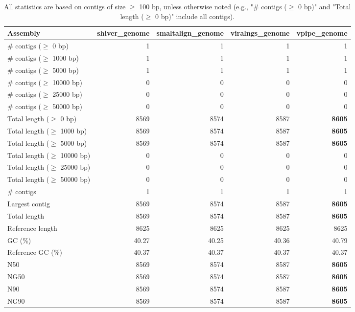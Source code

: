 \documentclass[12pt,a4paper]{article}
\begin{document}
\begin{table}[ht]
\begin{center}
\caption{All statistics are based on contigs of size $\geq$ 100 bp, unless otherwise noted (e.g., "\# contigs ($\geq$ 0 bp)" and "Total length ($\geq$ 0 bp)" include all contigs).}
\begin{tabular}{|l*{4}{|r}|}
\hline
Assembly & shiver\_genome & smaltalign\_genome & viralngs\_genome & vpipe\_genome \\ \hline
\# contigs ($\geq$ 0 bp) & 1 & 1 & 1 & 1 \\ \hline
\# contigs ($\geq$ 1000 bp) & 1 & 1 & 1 & 1 \\ \hline
\# contigs ($\geq$ 5000 bp) & 1 & 1 & 1 & 1 \\ \hline
\# contigs ($\geq$ 10000 bp) & 0 & 0 & 0 & 0 \\ \hline
\# contigs ($\geq$ 25000 bp) & 0 & 0 & 0 & 0 \\ \hline
\# contigs ($\geq$ 50000 bp) & 0 & 0 & 0 & 0 \\ \hline
Total length ($\geq$ 0 bp) & 8569 & 8574 & 8587 & {\bf 8605} \\ \hline
Total length ($\geq$ 1000 bp) & 8569 & 8574 & 8587 & {\bf 8605} \\ \hline
Total length ($\geq$ 5000 bp) & 8569 & 8574 & 8587 & {\bf 8605} \\ \hline
Total length ($\geq$ 10000 bp) & 0 & 0 & 0 & 0 \\ \hline
Total length ($\geq$ 25000 bp) & 0 & 0 & 0 & 0 \\ \hline
Total length ($\geq$ 50000 bp) & 0 & 0 & 0 & 0 \\ \hline
\# contigs & 1 & 1 & 1 & 1 \\ \hline
Largest contig & 8569 & 8574 & 8587 & {\bf 8605} \\ \hline
Total length & 8569 & 8574 & 8587 & {\bf 8605} \\ \hline
Reference length & 8625 & 8625 & 8625 & 8625 \\ \hline
GC (\%) & 40.27 & 40.25 & 40.36 & 40.79 \\ \hline
Reference GC (\%) & 40.37 & 40.37 & 40.37 & 40.37 \\ \hline
N50 & 8569 & 8574 & 8587 & {\bf 8605} \\ \hline
NG50 & 8569 & 8574 & 8587 & {\bf 8605} \\ \hline
N90 & 8569 & 8574 & 8587 & {\bf 8605} \\ \hline
NG90 & 8569 & 8574 & 8587 & {\bf 8605} \\ \hline

\end{tabular}
\end{center}
\end{table}
\end{document}
